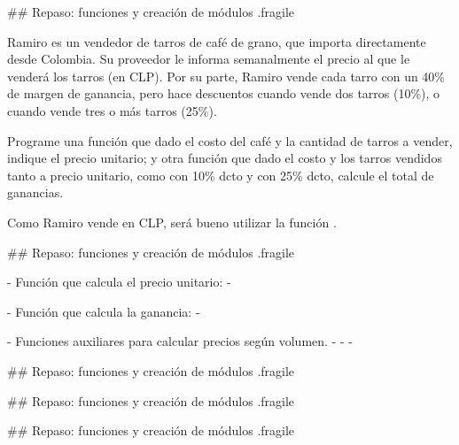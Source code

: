 ## Repaso: funciones y creación de módulos {.fragile}


\bgnblocknormal[justified]
\small
Ramiro es un vendedor de tarros de café de grano, que importa directamente desde Colombia. Su proveedor
le informa semanalmente el precio al que le venderá los tarros (en CLP).
Por su parte, Ramiro vende cada tarro con un 40\% de margen de ganancia, pero hace descuentos cuando
vende dos tarros (10\%), o cuando vende tres o más tarros (25\%).
\newline

Programe una función que dado el costo del café y la cantidad de tarros a vender, indique el precio unitario;
y otra función que dado el costo y los tarros vendidos tanto a precio unitario, como con 10\% dcto y con 25\% dcto,
calcule el total de ganancias.
\newline

Como Ramiro vende en CLP, será bueno utilizar la función .
\trmblocknormal


## Repaso: funciones y creación de módulos {.fragile}


- Función que calcula el precio unitario:
    - 

\vfill

- Función que calcula la ganancia:
    - 

\vfill

- Funciones auxiliares para calcular precios según volumen.
    - 
    - 
    - 



## Repaso: funciones y creación de módulos {.fragile}


## Repaso: funciones y creación de módulos {.fragile}


## Repaso: funciones y creación de módulos {.fragile}

